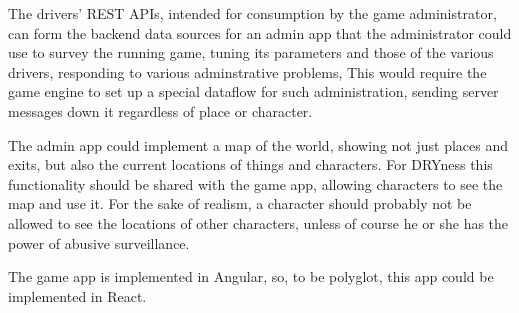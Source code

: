 The drivers' REST APIs, intended for consumption by the game
administrator, can form the backend data sources for an admin app that
the administrator could use to survey the running game,
tuning its parameters and those of the various drivers, responding to
various adminstrative problems, \etc
This would require the game engine to set
up a special dataflow for such administration, sending server messages down
it regardless of place or character.

The admin app could implement a map of the world, showing not just places and
exits, but also the current locations of things and characters.
For DRYness this functionality should be shared with the game app, allowing
characters to see the map and use it.
For the sake of realism, a character should probably not be
allowed to see the locations of other characters, unless of course he
or she has the power of abusive surveillance.

The game app is implemented in Angular, so, to be polyglot, this app could be
implemented in React.
